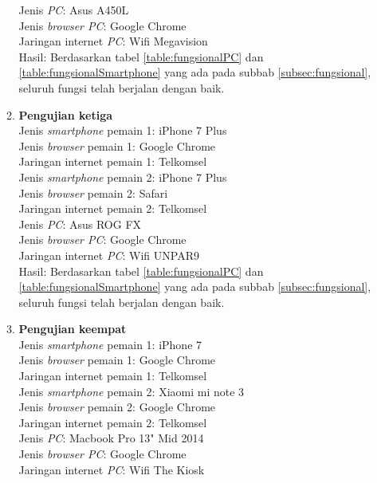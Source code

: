 \begin{enumerate}
\begin{enumerate}
		Jenis \textit{PC}: Asus A450L\\
		Jenis \textit{browser PC}: Google Chrome\\
		Jaringan internet \textit{PC}: Wifi Megavision\\
		
		Hasil: Berdasarkan tabel \ref{table:fungsionalPC} dan \ref{table:fungsionalSmartphone} yang ada pada subbab \ref{subsec:fungsional}, seluruh fungsi telah berjalan dengan baik.
		
		\item \textbf{Pengujian ketiga} \\
		Jenis \textit{smartphone} pemain 1: iPhone 7 Plus\\
		Jenis \textit{browser} pemain 1: Google Chrome\\
		Jaringan internet pemain 1: Telkomsel\\
		
		Jenis \textit{smartphone} pemain 2: iPhone 7 Plus\\
		Jenis \textit{browser} pemain 2: Safari\\
		Jaringan internet pemain 2: Telkomsel\\
		
		Jenis \textit{PC}: Asus ROG FX\\
		Jenis \textit{browser PC}: Google Chrome\\
		Jaringan internet \textit{PC}: Wifi UNPAR9\\
		
		Hasil: Berdasarkan tabel \ref{table:fungsionalPC} dan \ref{table:fungsionalSmartphone} yang ada pada subbab \ref{subsec:fungsional}, seluruh fungsi telah berjalan dengan baik.
		
		\item \textbf{Pengujian keempat} \\
		Jenis \textit{smartphone} pemain 1: iPhone 7\\
		Jenis \textit{browser} pemain 1: Google Chrome\\
		Jaringan internet pemain 1: Telkomsel\\
		
		Jenis \textit{smartphone} pemain 2: Xiaomi mi note 3\\
		Jenis \textit{browser} pemain 2: Google Chrome\\
		Jaringan internet pemain 2: Telkomsel\\
		
		Jenis \textit{PC}: Macbook Pro 13" Mid 2014\\
		Jenis \textit{browser PC}: Google Chrome\\
		Jaringan internet \textit{PC}: Wifi The Kiosk\\
		

\end{enumerate}
\end{enumerate}
